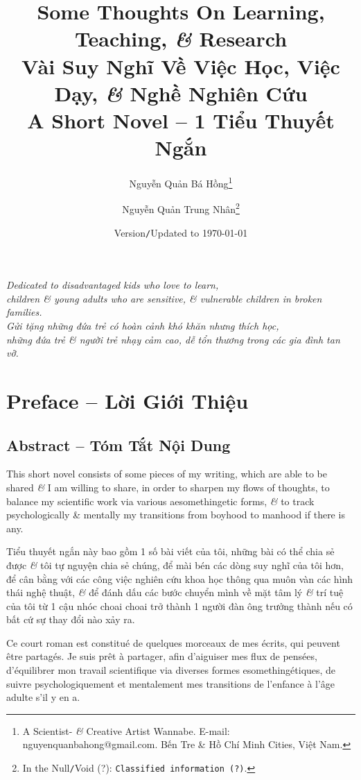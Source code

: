 \documentclass[12pt,twoside]{book}
\title{Some Thoughts On Learning, Teaching, {\it\&} Research\\Vài Suy Nghĩ Về Việc Học, Việc Dạy, {\it\&} Nghề Nghiên Cứu\\{\Large\sf A Short Novel -- 1 Tiểu Thuyết Ngắn}}
\author{\sc Nguyễn Quản Bá Hồng\footnote{A Scientist- {\it\&} Creative Artist Wannabe. E-mail: {\sf nguyenquanbahong@gmail.com}. Bến Tre \& Hồ Chí Minh Cities, Việt Nam.}\and\sf Nguyễn Quản Trung Nhân\footnote{In the {\sf Null{\tt/}Void} (?): {\tt Classified information (?)}.}}
\date{Version{\tt/}Updated to \today}
\begin{document}
\maketitle
\setcounter{secnumdepth}{4}
\setcounter{tocdepth}{4}
\dominitoc%
\clearpage
\begin{center}
	\thispagestyle{empty}
	\vspace*{\fill}\it
	Dedicated to disadvantaged kids who love to learn,\\\vspace{2mm} children \& young adults who are sensitive, \& vulnerable children in broken families.\\\vspace{2cm}
	Gửi tặng những đứa trẻ có hoàn cảnh khó khăn nhưng thích học,\\\vspace{2mm} những đứa trẻ \& người trẻ nhạy cảm cao, dễ tổn thương trong các gia đình tan vỡ.
	\vspace*{\fill}
\end{center}
\clearpage
\tableofcontents

\chapter*{Preface -- Lời Giới Thiệu}

\section*{Abstract -- Tóm Tắt Nội Dung}
{\sf[en]} This short novel consists of some pieces of my writing, which are able to be shared {\it\&} I am willing to share, in order to sharpen my flows of thoughts, to balance my scientific work via various aesomethingetic forms, {\it\&} to track psychologically \& mentally my transitions from boyhood to manhood if there is any.
\vspace{2mm}

\noindent{\sf[vi]} Tiểu thuyết ngắn này bao gồm 1 số bài viết của tôi, những bài có thể chia sẻ được {\it\&} tôi tự nguyện chia sẻ chúng, để mài bén các dòng suy nghĩ của tôi hơn, để cân bằng với các công việc nghiên cứu khoa học thông qua muôn vàn các hình thái nghệ thuật, {\it\&} để đánh dấu các bước chuyển mình về mặt tâm lý {\it\&} trí tuệ của tôi từ 1 cậu nhóc choai choai trở thành 1 người đàn ông trưởng thành nếu có bất cứ sự thay đổi nào xảy ra.
\vspace{2mm}

\noindent{\sf[fr]} Ce court roman est constitué de quelques morceaux de mes écrits, qui peuvent être partagés. Je suis prêt à partager, afin d'aiguiser mes flux de pensées, d'équilibrer mon travail scientifique via diverses formes esomethingétiques, de suivre psychologiquement et mentalement mes transitions de l'enfance à l'âge adulte s'il y en a.
\vspace{2mm}
\end{document}
